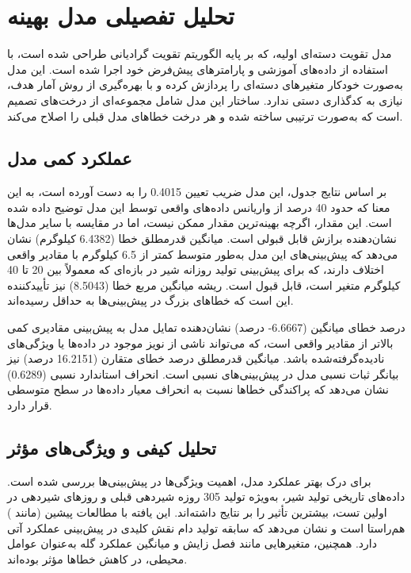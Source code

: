 \section{تحلیل تفصیلی مدل بهینه}

مدل تقویت دسته‌ای اولیه، که بر پایه الگوریتم تقویت گرادیانی طراحی شده است، با استفاده از داده‌های آموزشی و پارامترهای پیش‌فرض خود اجرا شده است. این مدل به‌صورت خودکار متغیرهای دسته‌ای را پردازش کرده و با بهره‌گیری از روش آمار هدف، نیازی به کدگذاری دستی ندارد. ساختار این مدل شامل مجموعه‌ای از درخت‌های تصمیم است که به‌صورت ترتیبی ساخته شده و هر درخت خطاهای مدل قبلی را اصلاح می‌کند.

\subsection{عملکرد کمی مدل}
بر اساس نتایج جدول، این مدل ضریب تعیین \num{0.4015} را به دست آورده است، به این معنا که حدود 40 درصد از واریانس داده‌های واقعی توسط این مدل توضیح داده شده است. این مقدار، اگرچه بهینه‌ترین مقدار ممکن نیست، اما در مقایسه با سایر مدل‌ها نشان‌دهنده برازش قابل قبولی است. میانگین قدرمطلق خطا (\num{6.4382} کیلوگرم) نشان می‌دهد که پیش‌بینی‌های این مدل به‌طور متوسط کمتر از \num{6.5} کیلوگرم با مقادیر واقعی اختلاف دارند، که برای پیش‌بینی تولید روزانه شیر در بازه‌ای که معمولاً بین 20 تا 40 کیلوگرم متغیر است، قابل قبول است. ریشه میانگین مربع خطا (\num{8.5043}) نیز تأییدکننده این است که خطاهای بزرگ در پیش‌بینی‌ها به حداقل رسیده‌اند.

درصد خطای میانگین (\num{6.6667}- درصد) نشان‌دهنده تمایل مدل به پیش‌بینی مقادیری کمی بالاتر از مقادیر واقعی است، که می‌تواند ناشی از نویز موجود در داده‌ها یا ویژگی‌های نادیده‌گرفته‌شده باشد. میانگین قدرمطلق درصد خطای متقارن (\num{16.2151} درصد) نیز بیانگر ثبات نسبی مدل در پیش‌بینی‌های نسبی است. انحراف استاندارد نسبی (\num{0.6289}) نشان می‌دهد که پراکندگی خطاها نسبت به انحراف معیار داده‌ها در سطح متوسطی قرار دارد.

\subsection{تحلیل کیفی و ویژگی‌های مؤثر}
برای درک بهتر عملکرد مدل، اهمیت ویژگی‌ها در پیش‌بینی‌ها بررسی شده است. داده‌های تاریخی تولید شیر، به‌ویژه تولید 305 روزه شیردهی قبلی و روزهای شیردهی در اولین تست، بیشترین تأثیر را بر نتایج داشته‌اند. این یافته با مطالعات پیشین (مانند \cite{Salamone2022}) هم‌راستا است و نشان می‌دهد که سابقه تولید دام نقش کلیدی در پیش‌بینی عملکرد آتی دارد. همچنین، متغیرهایی مانند فصل زایش و میانگین عملکرد گله به‌عنوان عوامل محیطی، در کاهش خطاها مؤثر بوده‌اند.

